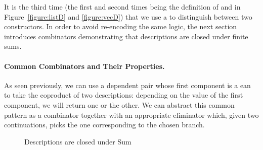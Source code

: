 It is the third time (the first and second times being the definition of
 and  in Figure~\ref{figure:listD} and \ref{figure:vecD})
that we use a  to distinguish between two constructors. In order
to avoid re-encoding the same logic,
the next section introduces combinators demonstrating that
descriptions are closed under finite sums.

\paragraph{Common Combinators and Their Properties.}\label{desccomb}

As seen previously, we can use a dependent pair whose first component
is a ean to take the coproduct of two descriptions: depending
on the value of the first component, we will return one or the other.
We can abstract this common pattern as a combinator  together
with an appropriate eliminator  which, given two continuations,
picks the one corresponding to the chosen branch.

\begin{figure}[h]
\begin{minipage}{0.35\textwidth}
\end{minipage}\hfill
\begin{minipage}{0.55\textwidth}
\end{minipage}
\caption{Descriptions are closed under Sum}\label{figure:descsum}
\end{figure}



